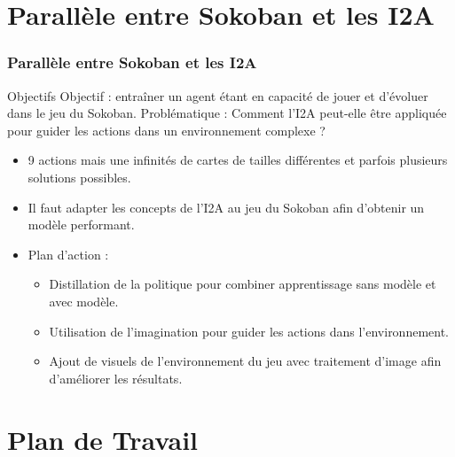 \documentclass[
	11pt, %
]{beamer}
\begin{document}
\section{Parallèle entre Sokoban et les I2A}

\begin{frame}
	\frametitle{Parallèle entre Sokoban et les I2A}

	\begin{block}{Objectifs}
		Objectif : entraîner un agent étant en capacité de jouer et d'évoluer dans le jeu du Sokoban.
		Problématique : Comment l'I2A peut-elle être appliquée pour guider les actions dans un environnement complexe ?
	\end{block}

	\smallskip %
	
	\begin{itemize}
		\item 9 actions mais une infinités de cartes de tailles différentes et parfois plusieurs solutions possibles.
		\item Il faut adapter les concepts de l'I2A au jeu du Sokoban afin d'obtenir un modèle performant.
		\item Plan d'action : 
		\begin{itemize}
			\item Distillation de la politique pour combiner apprentissage sans modèle et avec modèle.
			\item Utilisation de l'imagination pour guider les actions dans l'environnement.
			\item Ajout de visuels de l'environnement du jeu avec traitement d'image afin d'améliorer les résultats.
		\end{itemize}
	\end{itemize}
	
\end{frame}

\section{Plan de Travail}
\end{document}
